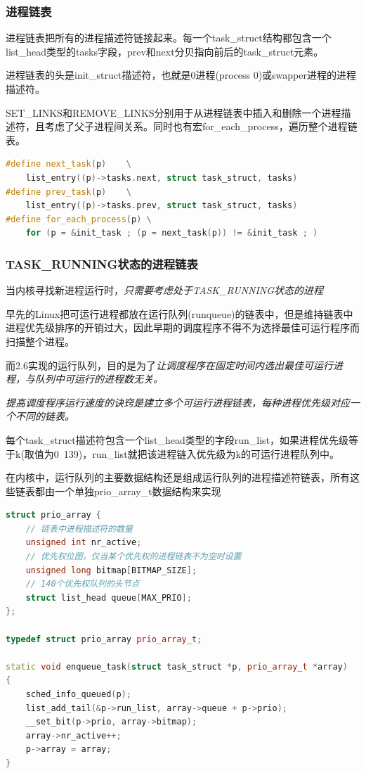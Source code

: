 \subsubsection{进程链表}

    进程链表把所有的进程描述符链接起来。每一个task\_struct结构都包含一个list\_head类型的tasks字段，prev和next分贝指向前后的task\_struct元素。

    进程链表的头是init\_struct描述符，也就是0进程(process 0)或swapper进程的进程描述符。

    SET\_LINKS和REMOVE\_LINKS分别用于从进程链表中插入和删除一个进程描述符，且考虑了父子进程间关系。同时也有宏for\_each\_process，遍历整个进程链表。

\begin{lstlisting}[language=C++]
#define next_task(p)	\
    list_entry((p)->tasks.next, struct task_struct, tasks)
#define prev_task(p)	\
    list_entry((p)->tasks.prev, struct task_struct, tasks)
#define for_each_process(p) \
    for (p = &init_task ; (p = next_task(p)) != &init_task ; )
\end{lstlisting}

\subsubsection{TASK\_RUNNING状态的进程链表}

    当内核寻找新进程运行时，\emph{只需要考虑处于TASK\_RUNNING状态的进程}

    早先的Linux把可运行进程都放在运行队列(runqueue)的链表中，但是维持链表中进程优先级排序的开销过大，因此早期的调度程序不得不为选择最佳可运行程序而扫描整个进程。

    而2.6实现的运行队列，目的是为了\emph{让调度程序在固定时间内选出最佳可运行进程，与队列中可运行的进程数无关。}

    \emph{提高调度程序运行速度的诀窍是建立多个可运行进程链表，每种进程优先级对应一个不同的链表。}

    每个task\_struct描述符包含一个list\_head类型的字段run\_list，如果进程优先级等于k(取值为0~139)，run\_list就把该进程链入优先级为k的可运行进程队列中。

    在内核中，运行队列的主要数据结构还是组成运行队列的进程描述符链表，所有这些链表都由一个单独prio\_array\_t数据结构来实现

\begin{lstlisting}[language=C++]
struct prio_array {
    // 链表中进程描述符的数量
    unsigned int nr_active;
    // 优先权位图，仅当某个优先权的进程链表不为空时设置
    unsigned long bitmap[BITMAP_SIZE];
    // 140个优先权队列的头节点
    struct list_head queue[MAX_PRIO];
};

typedef struct prio_array prio_array_t;

static void enqueue_task(struct task_struct *p, prio_array_t *array)
{
	sched_info_queued(p);
	list_add_tail(&p->run_list, array->queue + p->prio);
	__set_bit(p->prio, array->bitmap);
	array->nr_active++;
	p->array = array;
}
\end{lstlisting}

